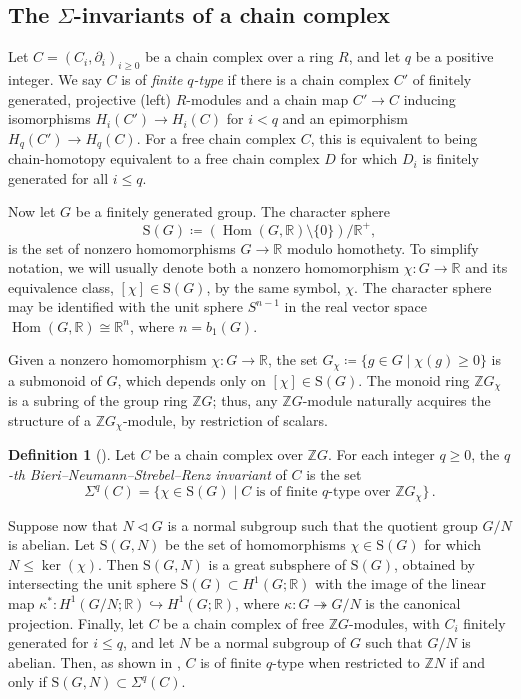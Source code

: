 \documentclass[11pt]{amsart}
\theoremstyle{definition}
\newtheorem{definition}[theorem]{Definition}
\newcommand{\Z}{\mathbb{Z}}
\newcommand{\R}{\mathbb{R}}
\newcommand{\rS}{\mathrm{S}}
\DeclareMathOperator{\Hom}{{Hom}}
\newcommand{\surj}{\twoheadrightarrow}
\newcommand{\inj}{\hookrightarrow}
\begin{document}
\subsection{The \texorpdfstring{$\Sigma$}{Sigma}-invariants of a chain complex}
\label{subsec:bnsr cc}
Let $C=(C_i,\partial_i)_{i\ge 0}$ be a chain complex over a ring $R$, 
and let $q$ be a positive integer. We say $C$ is of {\em finite $q$-type}\/ 
if there is a chain complex $C'$ of finitely generated, projective 
(left) $R$-modules and a chain map $C'\to C$ inducing isomorphisms 
$H_i(C')\to H_i(C)$ for $i<q$ and an epimorphism 
$H_q(C')\to H_q(C)$. For a free chain complex $C$, this is equivalent 
to being chain-homotopy equivalent to a free chain complex $D$ 
for which $D_i$ is finitely generated for all $i\leq q$.

Now let $G$ be a finitely generated group.  The character sphere 
\begin{equation}
\label{eq:sg}
\rS(G)\coloneqq (\Hom(G,\R)\setminus\{0\})/\R^{+},
\end{equation}
is the set of nonzero homomorphisms $G\to \R$ modulo 
homothety. To simplify notation, we will usually denote both 
a nonzero homomorphism $\chi\colon G\to \R$ and its equivalence 
class, $[\chi] \in \rS(G)$, by the same symbol, $\chi$. The character 
sphere may be identified with the unit sphere $S^{n-1}$ in the 
real vector space $\Hom(G,\R)\cong \R^n$, where $n=b_1(G)$.  

Given a nonzero homomorphism $\chi\colon G\to \R$, the set  
$G_{\chi}\coloneqq\{ g \in G \mid \chi(g)\ge 0\}$ 
is a submonoid of $G$, which depends only on  
$[\chi]\in \rS(G)$. The monoid ring 
$\Z{G}_{\chi}$ is a subring of the group ring $\Z{G}$; 
thus, any $\Z{G}$-module naturally acquires the structure of a 
$\Z{G}_{\chi}$-module, by restriction of scalars.

\begin{definition}[\cite{FGS}]  
\label{def:sigma chain}
Let $C$ be a chain complex over $\Z{G}$.  For each 
integer $q\ge 0$, the {\em $q$-th 
Bieri--Neumann--Strebel--Renz invariant}\/ of $C$ 
is the set
\begin{equation}
\label{eq:sigmakc}
\Sigma^q(C)=\big\{\chi\in \rS(G) \mid 
\text{$C$ is of finite $q$-type over $\Z{G}_{\chi}$}\big\}\, .
\end{equation}
\end{definition}

Suppose now that $N\triangleleft G$ is a normal 
subgroup such that the quotient group $G/N$ is abelian.  Let  
$\rS(G,N)$ be the set of homomorphisms $\chi \in \rS(G)$ 
for which $N\le \ker (\chi)$. Then $\rS(G,N)$ 
is a great subsphere of $\rS(G)$, obtained by intersecting 
the unit sphere $\rS(G)\subset H^1(G;\R)$ 
with the image of the linear map 
$\kappa^*\colon H^1(G/N;\R) \inj H^1(G;\R)$, 
where  $\kappa\colon G\surj G/N$ is the canonical projection. 
Finally, let $C$ be a chain complex of free $\Z{G}$-modules, with 
$C_i$ finitely generated for $i\le q$, and let $N$ be a 
normal subgroup of $G$ such that $G/N$ is abelian. 
Then, as shown in \cite{FGS},  $C$ is of finite $q$-type when 
restricted to $\Z{N}$ if and only if $\rS(G,N)\subset \Sigma^q(C)$.
\end{document}
